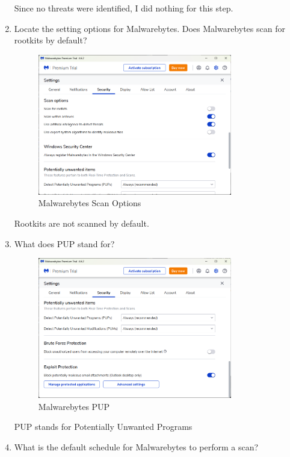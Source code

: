 \documentclass[12pt]{article}
\newenvironment{problem}[2][Problem]{\begin{trivlist}
\item[\hskip \labelsep {\bfseries #1}\hskip \labelsep {\bfseries #2.}]}{\end{trivlist}}
\begin{document}
\begin{problem}{1}
\begin{enumerate}
    Since no threats were identified, I did nothing for this step.
    \pagebreak
    \item Locate the setting options for Malwarebytes. Does Malwarebytes scan for rootkits by default?
    \begin{figure}[H]
        \centering
        \includegraphics[width=0.8\textwidth]{rootkit}
        \caption{Malwarebytes Scan Options}
    \end{figure}
    Rootkits are not scanned by default.
    \pagebreak
    \item What does PUP stand for?
    \begin{figure}[H]
        \centering
        \includegraphics[width=0.8\textwidth]{pup}
        \caption{Malwarebytes PUP}
    \end{figure}
    PUP stands for Potentially Unwanted Programs
    \pagebreak
    \item What is the default schedule for Malwarebytes to perform a scan?
    \begin{figure}[H]
        \centering

\end{figure}
\end{enumerate}
\end{problem}
\end{document}
